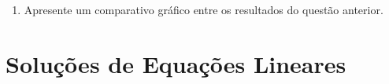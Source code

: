 \begin{enumerate}[label=\thesection.\arabic*]
\begin{itemize}
    \item Utilizando programação orientada a objetos (POO), desenvolva um \textit{script} que implemente:
    \begin{itemize}
        \item Regressão polinomial
        \item Interpolação de Lagrange
        \item Interpolação de Newton
        \item Splines (linear, quadrática e cúbica)
    \end{itemize}
    \item Compare os resultados entre os métodos.
    \item Apresente análise gráfica e quantitativa dos erros.
\end{itemize}

\item Apresente um comparativo gráfico entre os resultados do questão anterior.

\end{enumerate}
\section{Soluções de Equações Lineares} \label{sec:SolSistLineares}

